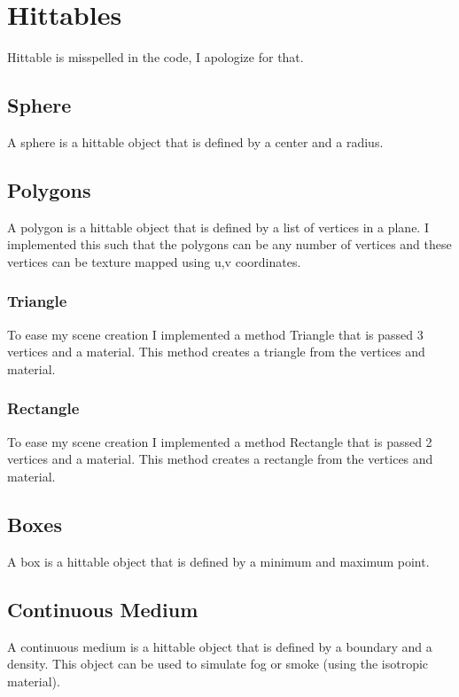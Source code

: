 \documentclass{article}
\begin{document}
\section{Hittables}
    Hittable is misspelled in the code, I apologize for that. \par


    \subsection{Sphere}
    A sphere is a hittable object that is defined by a center and a radius.  \par


    \subsection{Polygons}
    A polygon is a hittable object that is defined by a list of vertices in a plane. I implemented this such that the polygons can be any number of vertices and these vertices can be texture mapped using u,v coordinates. \par


        \subsubsection{Triangle}
        To ease my scene creation I implemented a method Triangle that is passed 3 vertices and a material. This method creates a triangle from the vertices and material. \par


        \subsubsection{Rectangle}
        To ease my scene creation I implemented a method Rectangle that is passed 2 vertices and a material. This method creates a rectangle from the vertices and material. \par



    \subsection{Boxes}
    A box is a hittable object that is defined by a minimum and maximum point. \par



    \subsection{Continuous Medium}
    A continuous medium is a hittable object that is defined by a boundary and a density. This object can be used to simulate fog or smoke (using the isotropic material). \par
\end{document}
